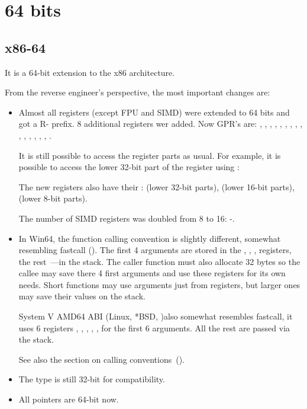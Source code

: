 \section{64 bits}

\subsection{x86-64}
\label{x86-64}

It is a 64-bit extension to the x86 architecture.

From the reverse engineer's perspective, the most important changes are:

\myindex{\CLanguageElements!\Pointers}
\begin{itemize}

\item

Almost all registers (except FPU and SIMD) were extended to 64 bits and got a R- prefix.
8 additional registers wer added.
Now \ac{GPR}'s are: \RAX, \RBX, \RCX, \RDX, 
\RBP, \RSP, \RSI, \RDI, , , , 
, , , , . 

It is still possible to access the  register parts as usual. 
For example, it is possible to access the lower 32-bit part of the \RAX register using \EAX:


The new  registers also have their :  (lower 32-bit parts),
 (lower 16-bit parts),  (lower 8-bit parts).


The number of SIMD registers was doubled from 8 to 16: -.

\item

In Win64, the function calling convention is slightly different, somewhat resembling fastcall
().
The first 4 arguments are stored in the \RCX, \RDX, ,  registers, the rest~---in the stack.
The \gls{caller} function must also allocate 32 bytes so the \gls{callee} may save there 4 first arguments and use these 
registers for its own needs.
Short functions may use arguments just from registers, but larger ones may save their values on the stack.

System V AMD64 ABI (Linux, *BSD, \MacOSX)\SysVABI also somewhat resembles
fastcall, it uses 6 registers 
\RDI, \RSI, \RDX, \RCX, ,  for the first 6 arguments.
All the rest are passed via the stack.

See also the section on calling conventions~().

\item
The \CCpp \Tint type is still 32-bit for compatibility.

\item
All pointers are 64-bit now.

\end{itemize}

